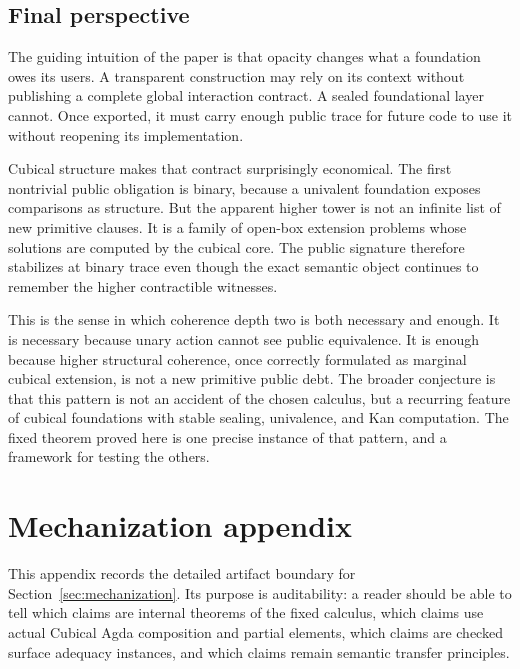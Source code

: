 \documentclass{lmcs}
\begin{document}
\subsection{Final perspective}
\label{subsec:conclusion-final-perspective}

The guiding intuition of the paper is that opacity changes what a foundation owes its users.
A transparent construction may rely on its context without publishing a complete global
interaction contract.  A sealed foundational layer cannot.  Once exported, it must carry enough
public trace for future code to use it without reopening its implementation.

Cubical structure makes that contract surprisingly economical.  The first nontrivial public
obligation is binary, because a univalent foundation exposes comparisons as structure.  But the
apparent higher tower is not an infinite list of new primitive clauses.  It is a family of
open-box extension problems whose solutions are computed by the cubical core.  The public
signature therefore stabilizes at binary trace even though the exact semantic object continues
to remember the higher contractible witnesses.

This is the sense in which coherence depth two is both necessary and enough.  It is necessary
because unary action cannot see public equivalence.  It is enough because higher structural
coherence, once correctly formulated as marginal cubical extension, is not a new primitive
public debt.  The broader conjecture is that this pattern is not an accident of the chosen
calculus, but a recurring feature of cubical foundations with stable sealing, univalence, and
Kan computation.  The fixed theorem proved here is one precise instance of that pattern, and a
framework for testing the others.

\appendix

\section{Mechanization appendix}
\label{app:mechanization-audit}

This appendix records the detailed artifact boundary for
Section~\ref{sec:mechanization}.  Its purpose is auditability: a reader should be able to tell
which claims are internal theorems of the fixed calculus, which claims use actual Cubical Agda
composition and partial elements, which claims are checked surface adequacy instances, and which
claims remain semantic transfer principles.
\end{document}
